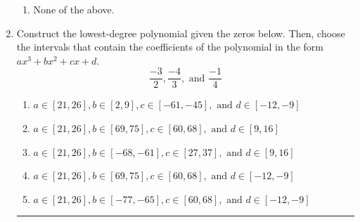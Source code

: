 \documentclass[14pt]{extbook}
\newcommand{\litem}[1]{\item#1\hspace*{-1cm}\rule{\textwidth}{0.4pt}}
\begin{document}
\begin{enumerate}
{\begin{enumerate}[label=\Alph*.]
\item None of the above.
\end{enumerate} }
\litem{
Construct the lowest-degree polynomial given the zeros below. Then, choose the intervals that contain the coefficients of the polynomial in the form $ax^3+bx^2+cx+d$.\[ \frac{-3}{2}, \frac{-4}{3}, \text{ and } \frac{-1}{4} \]\begin{enumerate}[label=\Alph*.]
\item \( a \in [21, 26], b \in [2, 9], c \in [-61, -45], \text{ and } d \in [-12, -9] \)
\item \( a \in [21, 26], b \in [69, 75], c \in [60, 68], \text{ and } d \in [9, 16] \)
\item \( a \in [21, 26], b \in [-68, -61], c \in [27, 37], \text{ and } d \in [9, 16] \)
\item \( a \in [21, 26], b \in [69, 75], c \in [60, 68], \text{ and } d \in [-12, -9] \)
\item \( a \in [21, 26], b \in [-77, -65], c \in [60, 68], \text{ and } d \in [-12, -9] \)


\end{enumerate}}
\end{enumerate}
\end{document}
